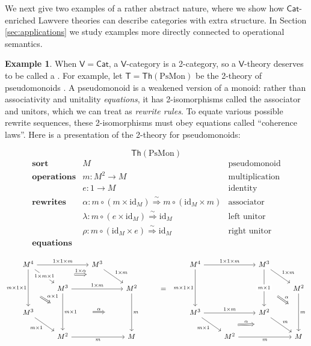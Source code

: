 \documentclass{amsart}
\newcommand{\define}[1]{{\bf \boldmath{#1}}}
\theoremstyle{definition}
\newtheorem{example}[theorem]{Example}
\newcommand{\Th}{\mathsf{Th}}
\newcommand{\Cat}{\mathsf{Cat}}
\newcommand{\V}{\mathsf{V}}
\newcommand{\T}{\mathsf{T}}
\newcommand{\maps}{\colon}
\newcommand{\id}{\mathrm{id}}
\begin{document}
We next give two examples of a rather abstract nature, where we show how $\Cat$-enriched Lawvere theories can describe categories with extra structure.   In Section \ref{sec:applications} we study examples more directly connected to operational semantics.

\begin{example}
\label{ex:1}
When $\V = \Cat$, a $\V$-category is a 2-category, so a $\V$-theory deserves to be called a \define{2-theory}.  For example, let $\T = \Th(\mathrm{PsMon})$ be the 2-theory of pseudomonoids \cite{pseudo}.   A pseudomonoid is a weakened version of a monoid: rather than associativity and unitality \textit{equations}, it has 2-isomorphisms called the associator and unitors, which we can treat as \textit{rewrite rules}.  To equate various possible rewrite sequences, these 2-isomorphisms must obey equations called ``coherence laws''.  Here is a presentation of the 2-theory for pseudomonoids:

	\[ \Th(\mathrm{PsMon}) \]
	\[\begin{array}{lll}
	\textbf{sort} & M & \text{pseudomonoid}\\
	 \textbf{operations}
	& m\maps M^2 \to M & \text{multiplication}\\
	 & e\maps1 \to M & \text{identity}\\
	\textbf{rewrites} & \alpha \colon m \circ (m \times \id_M) \stackrel{\sim}{\Longrightarrow} m \circ (\id_M \times m) & \text{associator}\\
	& \lambda\maps  m \circ (e \times \id_M) \stackrel{\sim}{\Longrightarrow} \id_M & \text{left unitor}\\
	& \rho\maps m \circ (\id_M \times e) \stackrel{\sim}{\Longrightarrow} \id_M & \text{right unitor}\\
	\textbf{equations}
          \end{array}\]

        \[\begin{tikzcd}
          M^4 \ar[rr,"1\times 1\times m"] \ar[dr,"1\times m\times 1" description, ""name=a1] \ar[dd, "m\times 1\times 1",swap,""name=b1] && M^3 \ar[dr, "1\times m",""name=a2] \arrow[Rightarrow,"1\times \alpha",from=a1,to=a2,shorten >=1.3cm,shorten <=1.3cm] &&& M^4 \ar[rr, "1\times 1\times m"] \ar[dd,"m\times 1\times 1",swap,""name=d1] && M^3 \ar[dd,"m\times 1" description,""name=d2] \ar[dr,"1\times m"] %
          & \\
          & M^3 \ar[rr,"1\times m"] \ar[dd,"m\times 1",""name=b2] \arrow[Rightarrow,"\alpha\times 1",from=b1,to=b2,shorten >=0.7cm,shorten <=0.7cm] && M^2 \ar[dd,"m",""name=c1] & = & &&& M^2 \ar[dd,"m",""name=f1] \arrow[Rightarrow,"\alpha",from=d2,to=f1,shorten >=0.6cm,shorten <=0.6cm] \arrow[Rightarrow,"\alpha",from=b2,to=c1,shorten >=1.3cm,shorten <=1.3cm] \\
          M^3 \ar[dr,"m\times 1",swap] &&& && M^3 \ar[rr,"1\times m"] \ar[dr,"m\times 1",swap,,""name=e1] && M^2 \ar[dr,"m",,""name=e2] \arrow[Rightarrow,"\alpha",from=e1,to=e2,shorten >=1.3cm,shorten <=1.3cm] & \\
          & M^2 \ar[rr,"m",swap] && M && & M^2 \ar[rr,"m",swap] && M
        \end{tikzcd}\]


\end{example}
\end{document}
